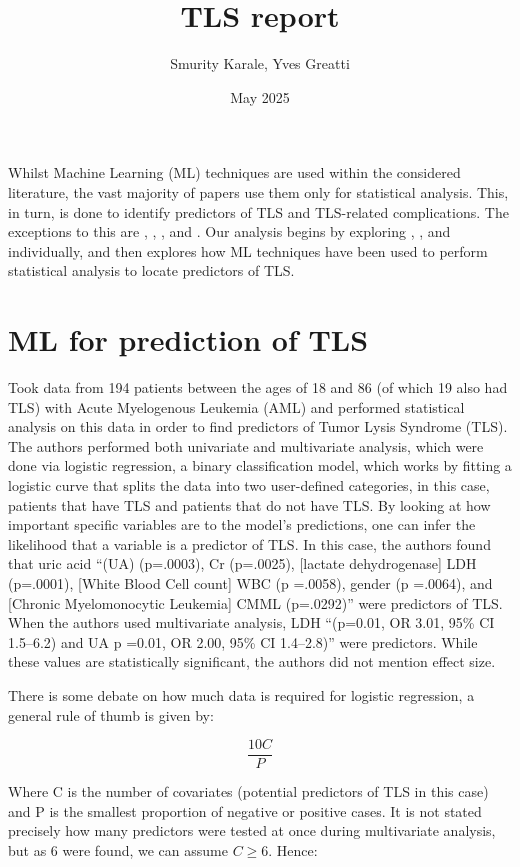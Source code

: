 \documentclass{article}
\title{TLS report}
\author{Smurity Karale, Yves Greatti}
\date{May 2025}
\begin{document}
\maketitle

Whilst Machine Learning (ML) techniques are used within the considered literature, the vast majority of papers use them only for statistical analysis. This, in turn, is done to identify predictors of TLS and TLS-related complications. The exceptions to this are ,  \cite{montesinos2008tumor}, \cite{mato2004predictive}, and  \cite{xiao2024prediction}. Our analysis begins by exploring \cite{montesinos2008tumor}, 
\cite{xiao2024prediction}, and  \cite{mato2004predictive} individually, and then explores how ML techniques have been used to perform statistical analysis to locate predictors of TLS.

\section{ML for prediction of TLS}

\cite{montesinos2008tumor} Took data from 194 patients between the ages of 18 and 86 (of which 19 also had TLS) with Acute Myelogenous Leukemia (AML) and performed statistical analysis on this data in order to find predictors of Tumor Lysis Syndrome (TLS). The authors performed both univariate and multivariate analysis, which were done via logistic regression, a binary classification model, which works by fitting a logistic curve that splits the data into two user-defined categories, in this case, patients that have TLS and patients that do not have TLS. By looking at how important specific variables are to the model’s predictions, one can infer the likelihood that a variable is a predictor of TLS. In this case, the authors found that uric acid “(UA) (p=.0003), Cr (p=.0025), [lactate dehydrogenase] LDH (p=.0001), [White Blood Cell count] WBC (p =.0058), gender (p =.0064), and [Chronic Myelomonocytic Leukemia] CMML (p=.0292)” were predictors of TLS. When the authors used multivariate analysis, LDH “(p=0.01, OR 3.01, 95\% CI 1.5–6.2) and UA p =0.01, OR 2.00, 95\% CI 1.4–2.8)” were predictors. While these values are statistically significant, the authors did not mention effect size.

There is some debate on how much data is required for logistic regression, a general rule of thumb is given by:

\[\frac{10C}{P}\]

Where C is the number of covariates (potential predictors of TLS in this case) and P is the smallest proportion of negative or positive cases. It is not stated precisely how many predictors were tested at once during multivariate analysis, but as 6 were found, we can assume \(C \geq 6\). Hence:
\end{document}
